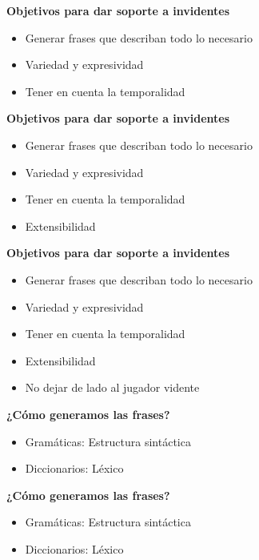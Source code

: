 \begin{tframe}{\textbf{Objetivos para dar soporte a invidentes}}
	\begin{itemize}
		\item Generar frases que describan todo lo necesario
		\item Variedad y expresividad
		\item<+-| alert@+> Tener en cuenta la temporalidad
	\end{itemize}
\end{tframe}

\begin{tframe}{\textbf{Objetivos para dar soporte a invidentes}}
	\begin{itemize}
		\item Generar frases que describan todo lo necesario
		\item Variedad y expresividad
		\item Tener en cuenta la temporalidad
		\item<+-| alert@+> Extensibilidad
	\end{itemize}
\end{tframe}

\begin{tframe}{\textbf{Objetivos para dar soporte a invidentes}}
	\begin{itemize}
		\item Generar frases que describan todo lo necesario
		\item Variedad y expresividad
		\item Tener en cuenta la temporalidad
		\item Extensibilidad
		\item<+-| alert@+> No dejar de lado al jugador vidente
	\end{itemize}
\end{tframe}


\begin{tframe}{\textbf{¿Cómo generamos las frases?}}
	\begin{itemize}
		\item Gramáticas: Estructura sintáctica
		\item Diccionarios: Léxico
	\end{itemize}
\end{tframe}

\begin{tframe}{\textbf{¿Cómo generamos las frases?}}
	\begin{itemize}
		\item<+-| alert@+> Gramáticas: Estructura sintáctica
		\item Diccionarios: Léxico
	\end{itemize}
\end{tframe}

